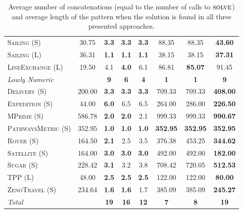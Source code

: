 \documentclass[11pt]{article}
\begin{document}
\begin{table}[tb]
{\begin{tabular}{|l||c||ccc||ccc||}
\textsc{Sailing} (S)&30.75&\textbf{3.3}&\textbf{3.3}&\textbf{3.3}&88.35&88.35&\textbf{43.60}\\
\textsc{Sailing} (L)&36.31&\textbf{1.1}&\textbf{1.1}&\textbf{1.1}&38.15&38.15&\textbf{37.31}\\
\textsc{LineExchange} (L)&19.50&4.1&\textbf{4.0}&6.1&86.81&\textbf{85.07}&91.45
\\\hline
\textit{Lowly Numeric}&&\textbf{9}&\textbf{6}&\textbf{4}&\textbf{1}&\textbf{1}&\textbf{9}\\\hline
\textsc{Delivery} (S)&200.00&\textbf{3.3}&\textbf{3.3}&\textbf{3.3}&709.33&709.33&\textbf{408.00}\\
\textsc{Expedition} (S)&44.00&\textbf{6.0}&6.5&6.5&264.00&286.00&\textbf{226.50}\\
\textsc{MPrime} (S)&586.78&\textbf{2.0}&\textbf{2.0}&2.1&999.33&999.33&\textbf{990.67}\\
\textsc{PathwaysMetric} (S)&352.95&\textbf{1.0}&\textbf{1.0}&\textbf{1.0}&\textbf{352.95}&\textbf{352.95}&\textbf{352.95}\\
\textsc{Rover} (S)&164.50&\textbf{2.1}&2.5&3.5&376.38&453.25&\textbf{344.62}\\
\textsc{Satellite} (S)&164.00&\textbf{3.0}&\textbf{3.0}&\textbf{3.0}&492.00&492.00&\textbf{182.00}\\
\textsc{Sugar} (S)&228.42&\textbf{3.1}&3.2&3.8&708.42&720.05&\textbf{512.53}\\
\textsc{TPP} (L)&48.00&\textbf{2.5}&\textbf{2.5}&\textbf{2.5}&122.00&122.00&\textbf{80.00}\\
\textsc{ZenoTravel} (S)&234.64&\textbf{1.6}&\textbf{1.6}&1.7&385.09&385.09&\textbf{245.27}
\\\hline
\textit{Total}&&\textbf{19}&\textbf{16}&\textbf{12}&\textbf{7}&\textbf{8}&\textbf{19}\\\hline

        \end{tabular}}
        \caption{Average number of concatenations (equal to the number of calls to $\textsc{solve}$) and average length of the pattern when the solution is found in all three presented approaches.}
        \label{tab:exp-search}
        \end{table}
        
\end{document}
